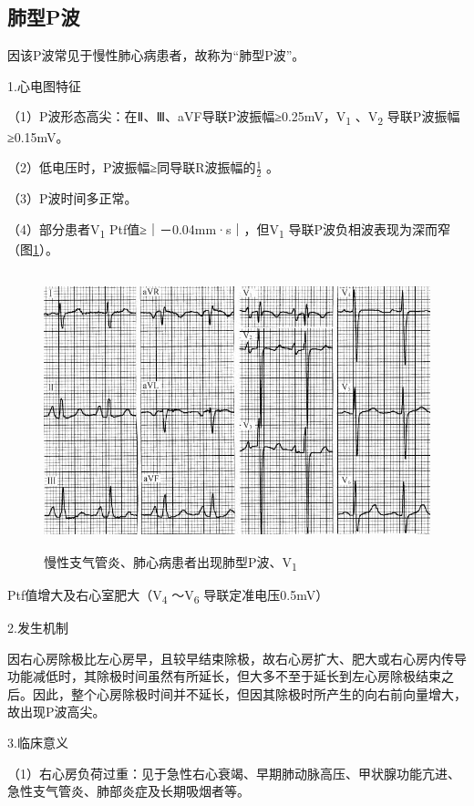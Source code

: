 \protect\hypertarget{text00007.htmlux5cux23subid5}{}{}

\subsection{肺型P波}

因该P波常见于慢性肺心病患者，故称为“肺型P波”。

1.心电图特征

（1）P波形态高尖：在Ⅱ、Ⅲ、aVF导联P波振幅≥0.25mV，V\textsubscript{1}
、V\textsubscript{2} 导联P波振幅≥0.15mV。

（2）低电压时，P波振幅≥同导联R波振幅的$\frac{1}{2}$
。

（3）P波时间多正常。

（4）部分患者V\textsubscript{1}
Ptf值≥｜－0.04mm·s｜，但V\textsubscript{1}
导联P波负相波表现为深而窄（图\ref{fig1-3}）。

\begin{figure}[!htbp]
 \centering
 \includegraphics[width=4.94792in,height=3.17708in]{./images/Image00008.jpg}
 \captionsetup{justification=centering}
 \caption{慢性支气管炎、肺心病患者出现肺型P波、V\textsubscript{1}}
 \label{fig1-3}
  \end{figure} 
Ptf值增大及右心室肥大（V\textsubscript{4} ～V\textsubscript{6}
导联定准电压0.5mV）

2.发生机制

因右心房除极比左心房早，且较早结束除极，故右心房扩大、肥大或右心房内传导功能减低时，其除极时间虽然有所延长，但大多不至于延长到左心房除极结束之后。因此，整个心房除极时间并不延长，但因其除极时所产生的向右前向量增大，故出现P波高尖。

3.临床意义

（1）右心房负荷过重：见于急性右心衰竭、早期肺动脉高压、甲状腺功能亢进、急性支气管炎、肺部炎症及长期吸烟者等。

